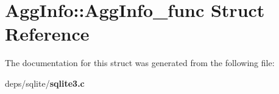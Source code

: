 \section{Agg\-Info::Agg\-Info\_\-func Struct Reference}
\label{structAggInfo_1_1AggInfo__func}


The documentation for this struct was generated from the following file:\begin{CompactItemize}
\item 
deps/sqlite/\bf{sqlite3.c}\end{CompactItemize}
